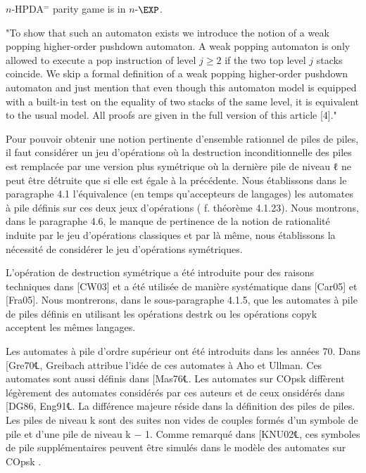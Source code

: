 \documentclass[a4paper,UKenglish,cleveref, autoref, thm-restate]{lipics-v2021}
\begin{document}

\begin{theorem}\label{HPDA parity game}
{\sc $n$-HPDA$^=$ parity game} is in $n$-$\EXP$.
\end{theorem}





\iffalse
"To show that such an automaton exists we introduce the notion of a weak
popping higher-order pushdown automaton. A weak popping automaton is only
allowed to execute a pop instruction of level $j \geq 2$ if the two top level $j$ stacks
coincide. We skip a formal definition of a weak popping higher-order pushdown
automaton and just mention that even though this automaton model is equipped
with a built-in test on the equality of two stacks of the same level, it is equivalent
to the usual model. All proofs are given in the full version of this article [4]."

Pour pouvoir obtenir une notion pertinente d'ensemble rationnel de piles de
piles, il faut considérer un jeu d'opérations où la destruction inconditionnelle des
piles est remplacée par une version plus symétrique où la dernière pile de niveau ℓ
ne peut être détruite que si elle est égale à la précédente. Nous établissons dans le
paragraphe 4.1 l'équivalence (en temps qu'accepteurs de langages) les automates
à pile définis sur ces deux jeux d'opérations ( f. théorème 4.1.23). Nous montrons,
dans le paragraphe 4.6, le manque de pertinence de la notion de rationalité induite
par le jeu d'opérations classiques et par là même, nous établissons la nécessité de
considérer le jeu d'opérations symétriques.

L'opération de destruction symétrique a été introduite pour des raisons techniques dans 
[CW03] et a été utilisée de manière 
systématique dans [Car05] et
[Fra05]. 
Nous montrerons, dans le sous-paragraphe 4.1.5, que les automates à pile
de piles définis en utilisant les opérations destrk ou les opérations copyk acceptent
les mêmes langages.

Les automates à pile d'ordre supérieur ont été introduits dans les années 70.
Dans [Gre70℄, Greibach attribue l'idée de ces automates à Aho et Ullman. Ces
automates sont aussi définis dans [Mas76℄. Les automates sur COpsk diffèrent
légèrement des automates considérés par ces auteurs et de ceux onsidérés dans
[DG86, Eng91℄. La différence majeure réside dans la définition des piles de piles.
Les piles de niveau k sont des suites non vides de couples formés d'un symbole de
pile et d'une pile de niveau k − 1. Comme remarqué dans [KNU02℄, ces symboles
de pile supplémentaires peuvent être simulés dans le modèle des automates sur
COpsk .
\end{document}
